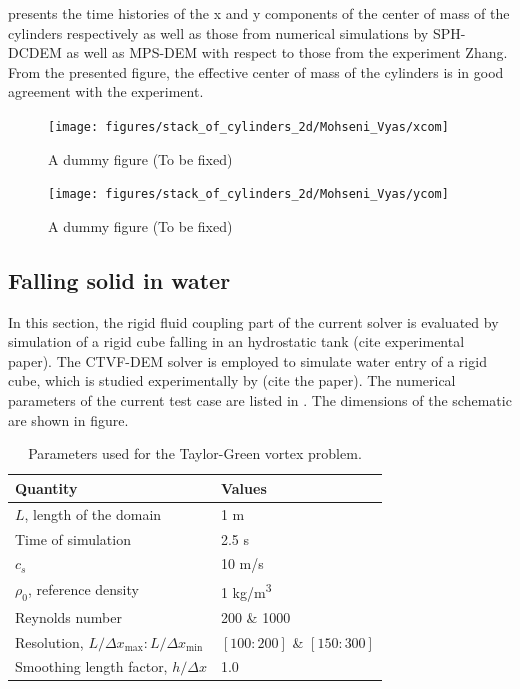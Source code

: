 \documentclass[preprint,12pt]{elsarticle}
\begin{document}
 presents the
time histories of the x and y components of the center of mass of the
cylinders respectively as well as those from numerical simulations by
SPH-DCDEM as well as MPS-DEM with respect to those from the experiment Zhang.
From the presented figure, the effective center of mass of the cylinders is in
good agreement with the experiment.

\begin{figure}[!htpb]
  \centering
  \texttt{[image: figures/stack\_of\_cylinders\_2d/Mohseni\_Vyas/xcom]}
  \caption{A dummy figure (To be fixed)}
\label{fig:x-com-stack-of-cylinders}
\end{figure}
\begin{figure}[!htpb]
  \centering
  \texttt{[image: figures/stack\_of\_cylinders\_2d/Mohseni\_Vyas/ycom]}
  \caption{A dummy figure (To be fixed)}
\label{fig:y-com-stack-of-cylinders}
\end{figure}


\FloatBarrier%
\subsection{Falling solid in water}
\label{sec:falling-solid-in-water}

In this section, the rigid fluid coupling part of the current solver is
evaluated by simulation of a rigid cube falling in an hydrostatic tank (cite
experimental paper). The CTVF-DEM solver is employed to simulate water entry
of a rigid cube, which is studied experimentally by (cite the paper). The
numerical parameters of the current test case are listed in
. The dimensions of the schematic are shown in
figure.

\begin{table}[!ht]
  \centering
  \begin{tabular}[!ht]{ll}
    \toprule
    Quantity & Values\\
    \midrule
    $L$, length of the domain & 1 m \\
    Time of simulation & 2.5 s \\
    $c_s$ & 10 m/s \\
    $\rho_0$, reference density & 1 kg/m\textsuperscript{3} \\
    Reynolds number & 200 \& 1000 \\
    Resolution, $L/\Delta x_{\max} : L/\Delta x_{\min}$ & $[100:200]$ \& $[150:300]$\\
    Smoothing length factor, $h/\Delta x$ & 1.0\\
    \bottomrule
  \end{tabular}
  \caption{Parameters used for the Taylor-Green vortex problem.}%
  \label{tab:stack-of-cylinders}
\end{table}
\end{document}
